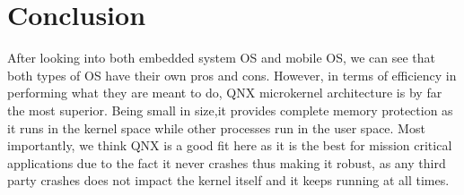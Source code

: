 \documentclass[conference]{IEEEtran}
\newcommand{\forceindent}{\leavevmode{\parindent=1em\indent}}
\begin{document}
\section{Conclusion}
\forceindent After looking into both embedded system OS and mobile OS, we can see that both types of OS have their own pros and cons. However, in terms of efficiency in performing what they are meant to do, QNX microkernel architecture is by far the most superior. Being small in size,it provides complete memory protection as it runs in the kernel space while other processes run in the user space. Most importantly, we think QNX is a good fit here as it is the best for mission critical applications due to the fact it never crashes thus making it robust, as any third party crashes does not impact the kernel itself and it keeps running at all times\cite{quora}.



%
%

\end{document}
